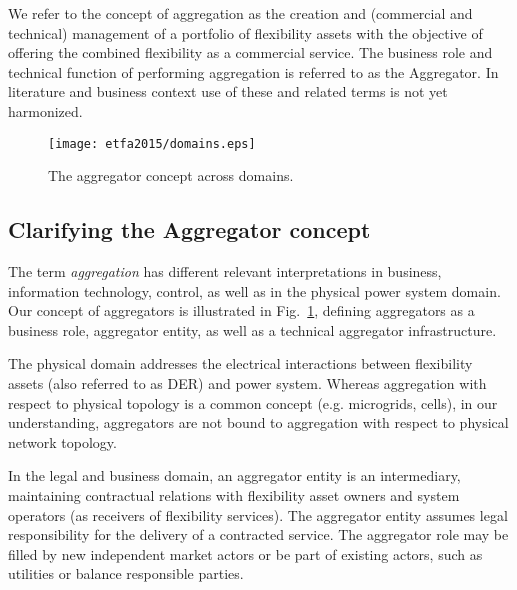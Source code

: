 We refer to the concept of aggregation as the  creation and (commercial and technical) management of a portfolio of flexibility assets with the objective of offering the combined flexibility as a commercial service. The business role and technical function of performing aggregation is referred to as the Aggregator. In literature and business context use of these and related terms is not yet harmonized.
\begin{figure}[t!]
\centering
\texttt{[image: etfa2015/domains.eps]}
\caption{The aggregator concept across domains.}
\label{fig:domains}
\vspace*{-5mm}
\end{figure}
\subsection{Clarifying the Aggregator concept}\label{subsec:clarifying}
The term \emph{aggregation} has different relevant interpretations in business, information technology,  control, as well as in the physical power system domain. Our concept of aggregators is illustrated in Fig.~\ref{fig:domains}, defining aggregators as a business role, aggregator entity, as well as a technical aggregator infrastructure.

The physical domain addresses the electrical interactions between flexibility assets (also referred to as DER) and power system. Whereas aggregation with respect to physical topology is a common concept (e.g. microgrids, cells), in our understanding, aggregators are not bound to aggregation with respect to physical network topology. 

In the legal and business domain, an aggregator entity is an intermediary, maintaining contractual relations with flexibility asset owners and system operators (as receivers of flexibility services). The aggregator entity assumes legal responsibility for the delivery of a contracted service. The aggregator role may be filled by new independent market actors or be part of existing actors, such as utilities or balance responsible parties.

